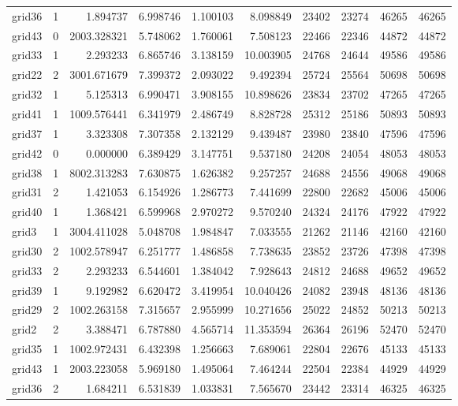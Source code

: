 \begin{longtable}{|l|r|r|r|r|r|r|r|r|r|}
grid36 & 1 & 1.894737 & 6.998746 & 1.100103 & 8.098849 & 23402 & 23274 & 46265 & 46265 \\
grid43 & 0 & 2003.328321 & 5.748062 & 1.760061 & 7.508123 & 22466 & 22346 & 44872 & 44872 \\
grid33 & 1 & 2.293233 & 6.865746 & 3.138159 & 10.003905 & 24768 & 24644 & 49586 & 49586 \\
grid22 & 2 & 3001.671679 & 7.399372 & 2.093022 & 9.492394 & 25724 & 25564 & 50698 & 50698 \\
grid32 & 1 & 5.125313 & 6.990471 & 3.908155 & 10.898626 & 23834 & 23702 & 47265 & 47265 \\
grid41 & 1 & 1009.576441 & 6.341979 & 2.486749 & 8.828728 & 25312 & 25186 & 50893 & 50893 \\
grid37 & 1 & 3.323308 & 7.307358 & 2.132129 & 9.439487 & 23980 & 23840 & 47596 & 47596 \\
grid42 & 0 & 0.000000 & 6.389429 & 3.147751 & 9.537180 & 24208 & 24054 & 48053 & 48053 \\
grid38 & 1 & 8002.313283 & 7.630875 & 1.626382 & 9.257257 & 24688 & 24556 & 49068 & 49068 \\
grid31 & 2 & 1.421053 & 6.154926 & 1.286773 & 7.441699 & 22800 & 22682 & 45006 & 45006 \\
grid40 & 1 & 1.368421 & 6.599968 & 2.970272 & 9.570240 & 24324 & 24176 & 47922 & 47922 \\
grid3 & 1 & 3004.411028 & 5.048708 & 1.984847 & 7.033555 & 21262 & 21146 & 42160 & 42160 \\
grid30 & 2 & 1002.578947 & 6.251777 & 1.486858 & 7.738635 & 23852 & 23726 & 47398 & 47398 \\
grid33 & 2 & 2.293233 & 6.544601 & 1.384042 & 7.928643 & 24812 & 24688 & 49652 & 49652 \\
grid39 & 1 & 9.192982 & 6.620472 & 3.419954 & 10.040426 & 24082 & 23948 & 48136 & 48136 \\
grid29 & 2 & 1002.263158 & 7.315657 & 2.955999 & 10.271656 & 25022 & 24852 & 50213 & 50213 \\
grid2 & 2 & 3.388471 & 6.787880 & 4.565714 & 11.353594 & 26364 & 26196 & 52470 & 52470 \\
grid35 & 1 & 1002.972431 & 6.432398 & 1.256663 & 7.689061 & 22804 & 22676 & 45133 & 45133 \\
grid43 & 1 & 2003.223058 & 5.969180 & 1.495064 & 7.464244 & 22504 & 22384 & 44929 & 44929 \\
grid36 & 2 & 1.684211 & 6.531839 & 1.033831 & 7.565670 & 23442 & 23314 & 46325 & 46325 \\

\end{longtable}
